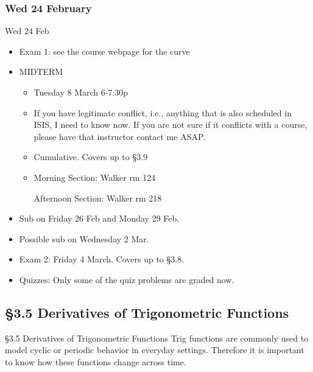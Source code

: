\documentclass[cal1spr16Lectures.tex]{subfiles}
\begin{document}

\subsubsection{\bf Wed 24 February}
\begin{frame}[allowframebreaks]{Wed 24 Feb}
\begin{itemize}\small
\item Exam 1: see the course webpage for the curve
\item MIDTERM 
\begin{itemize}\footnotesize
	\item Tuesday 8 March 6-7:30p
	\item If you have legitimate conflict, i.e., anything that is also scheduled in ISIS, I need to know now.  If you are not sure if it conflicts with a course, please have that instructor contact me ASAP.
	\item Cumulative.  Covers up to \S 3.9
	\item Morning Section: Walker rm 124
	
	Afternoon Section: Walker rm 218
\end{itemize}
\framebreak
\item Sub on Friday 26 Feb and Monday 29 Feb.
\item Possible sub on Wednesday 2 Mar.
\item Exam 2: Friday 4 March.  Covers up to \S 3.8.
\item Quizzes: Only some of the quiz problems are graded now.
\end{itemize}
\end{frame}

\subsection[3.5 Derivatives of Trigonometric Functions]{\S 3.5 Derivatives of Trigonometric Functions}

\begin{frame}{\S 3.5 Derivatives of Trigonometric Functions}
Trig functions are commonly used to model cyclic or periodic behavior in everyday settings.  Therefore it is important to know how these functions change across time.
\end{frame}
\end{document}
